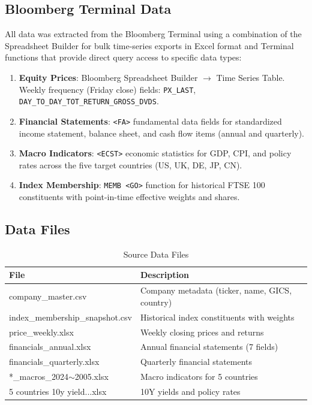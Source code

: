\documentclass[10pt,a4paper]{article}
\begin{document}
\subsection{Bloomberg Terminal Data}
All data was extracted from the Bloomberg Terminal using a combination of the Spreadsheet Builder for bulk time-series exports in Excel format and Terminal functions that provide direct query access to specific data types:
\begin{enumerate}
    \item \textbf{Equity Prices}: Bloomberg Spreadsheet Builder $\to$ Time Series Table. Weekly frequency (Friday close) fields: \texttt{PX\_LAST}, \texttt{DAY\_TO\_DAY\_TOT\_RETURN\_GROSS\_DVDS}.
    \item \textbf{Financial Statements}: \texttt{<FA>} fundamental data fields for standardized income statement, balance sheet, and cash flow items (annual and quarterly).
    \item \textbf{Macro Indicators}: \texttt{<ECST>} economic statistics for GDP, CPI, and policy rates across the five target countries (US, UK, DE, JP, CN).
    \item \textbf{Index Membership}: \texttt{MEMB <GO>} function for historical FTSE 100 constituents with point-in-time effective weights and shares.
\end{enumerate}

\subsection{Data Files}
\begin{table}[H]
\centering
\caption{Source Data Files}
\begin{tabular}{ll}
\toprule
\textbf{File} & \textbf{Description} \\
\midrule
company\_master.csv & Company metadata (ticker, name, GICS, country) \\
index\_membership\_snapshot.csv & Historical index constituents with weights \\
price\_weekly.xlsx & Weekly closing prices and returns \\
financials\_annual.xlsx & Annual financial statements (7 fields) \\
financials\_quarterly.xlsx & Quarterly financial statements \\
*\_macros\_2024$\sim$2005.xlsx & Macro indicators for 5 countries \\
5 countries 10y yield...xlsx & 10Y yields and policy rates \\
\bottomrule
\end{tabular}
\end{table}
\end{document}
